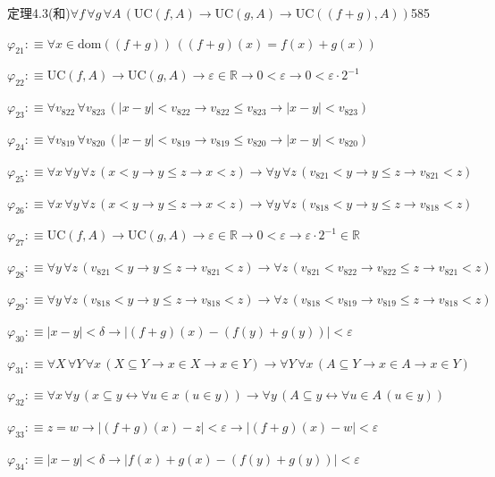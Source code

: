 \begin{fullproof}{定理4.3(和)}{$\forall f\,\forall g\,\forall A\,(\mathrm{UC}(f,A) \to \mathrm{UC}(g,A) \to \mathrm{UC}((f + g),A))$}{585}
\begin{abbrevlist}
\item $\varphi_{21} :\equiv \forall x \in \mathrm{dom}((f + g))\,((f + g)(x) = f(x) + g(x))$
\item $\varphi_{22} :\equiv \mathrm{UC}(f,A) \to \mathrm{UC}(g,A) \to \varepsilon \in \mathbb{R} \to 0 < \varepsilon \to 0 < \varepsilon \cdot 2^{-1}$
\item $\varphi_{23} :\equiv \forall v_{822}\,\forall v_{823}\,(\lvert x - y \rvert < v_{822} \to v_{822} \leq v_{823} \to \lvert x - y \rvert < v_{823})$
\item $\varphi_{24} :\equiv \forall v_{819}\,\forall v_{820}\,(\lvert x - y \rvert < v_{819} \to v_{819} \leq v_{820} \to \lvert x - y \rvert < v_{820})$
\item $\varphi_{25} :\equiv \forall x\,\forall y\,\forall z\,(x < y \to y \leq z \to x < z) \to \forall y\,\forall z\,(v_{821} < y \to y \leq z \to v_{821} < z)$
\item $\varphi_{26} :\equiv \forall x\,\forall y\,\forall z\,(x < y \to y \leq z \to x < z) \to \forall y\,\forall z\,(v_{818} < y \to y \leq z \to v_{818} < z)$
\item $\varphi_{27} :\equiv \mathrm{UC}(f,A) \to \mathrm{UC}(g,A) \to \varepsilon \in \mathbb{R} \to 0 < \varepsilon \to \varepsilon \cdot 2^{-1} \in \mathbb{R}$
\item $\varphi_{28} :\equiv \forall y\,\forall z\,(v_{821} < y \to y \leq z \to v_{821} < z) \to \forall z\,(v_{821} < v_{822} \to v_{822} \leq z \to v_{821} < z)$
\item $\varphi_{29} :\equiv \forall y\,\forall z\,(v_{818} < y \to y \leq z \to v_{818} < z) \to \forall z\,(v_{818} < v_{819} \to v_{819} \leq z \to v_{818} < z)$
\item $\varphi_{30} :\equiv \lvert x - y \rvert < \delta \to \lvert (f + g)(x) - (f(y) + g(y)) \rvert < \varepsilon$
\item $\varphi_{31} :\equiv \forall X\,\forall Y\,\forall x\,(X \subseteq Y \to x \in X \to x \in Y) \to \forall Y\,\forall x\,(A \subseteq Y \to x \in A \to x \in Y)$
\item $\varphi_{32} :\equiv \forall x\,\forall y\,(x \subseteq y \leftrightarrow \forall u \in x\,(u \in y)) \to \forall y\,(A \subseteq y \leftrightarrow \forall u \in A\,(u \in y))$
\item $\varphi_{33} :\equiv z = w \to \lvert (f + g)(x) - z \rvert < \varepsilon \to \lvert (f + g)(x) - w \rvert < \varepsilon$
\item $\varphi_{34} :\equiv \lvert x - y \rvert < \delta \to \lvert f(x) + g(x) - (f(y) + g(y)) \rvert < \varepsilon$

\end{abbrevlist}
\end{fullproof}
